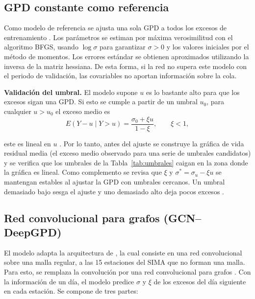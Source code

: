 \documentclass[11pt]{article}
\begin{document}
\subsection{GPD constante como referencia}
Como modelo de referencia se ajusta una sola GPD a todos los excesos de entrenamiento  \citep{Coles2001}. Los parámetros se estiman por máxima verosimilitud con el algoritmo BFGS, usando $\log\sigma$ para garantizar $\sigma>0$ y los valores iniciales por el método de momentos. Los errores estándar se obtienen aproximados utilizando la inversa de la matriz hessiana. De esta forma, si la red no supera este modelo con el periodo de validación, las covariables no aportan información sobre la cola. 

\textbf{Validación del umbral.} El modelo supone $u$ es lo bastante alto para que los excesos sigan una GPD. Si esto se cumple a partir de un umbral $u_0$, para cualquier $u > u_0$ el exceso medio es
\[
E(Y-u \mid Y>u) = \frac{\sigma_0 + \xi u}{1-\xi}, \qquad \xi < 1,
\]

este es lineal en $u$ \citep{Coles2001}. Por lo tanto, antes del ajuste se construye la gráfica de vida residual media (el exceso medio observado para una serie de umbrales candidatos) y se verifica que los umbrales de la Tabla~\ref{tab:umbrales} caigan en la zona donde la gráfica es lineal. Como complemento se revisa que  $\xi$ y $\sigma^* = \sigma_u - \xi u$ se mantengan estables al ajustar la GPD con umbrales cercanos. Un umbral demasiado bajo sesga el ajuste y uno demasiado alto deja pocos excesos \citep{tang2026}.

\subsection{Red convolucional para grafos (GCN--DeepGPD)}
El modelo adapta la arquitectura de \citet{wilson2022deepgpd}, la cual consiste en una red convolucional sobre una malla regular, a las 15 estaciones del SIMA que no forman una malla. Para esto, se remplaza la convolución por una red convolucional para grafos \citep{Bacciu2020GentleIntro}. Con la información de un día, el modelo predice $\sigma$ y $\xi$ de los excesos del día siguiente en cada estación. Se compone de tres partes: 
\end{document}
